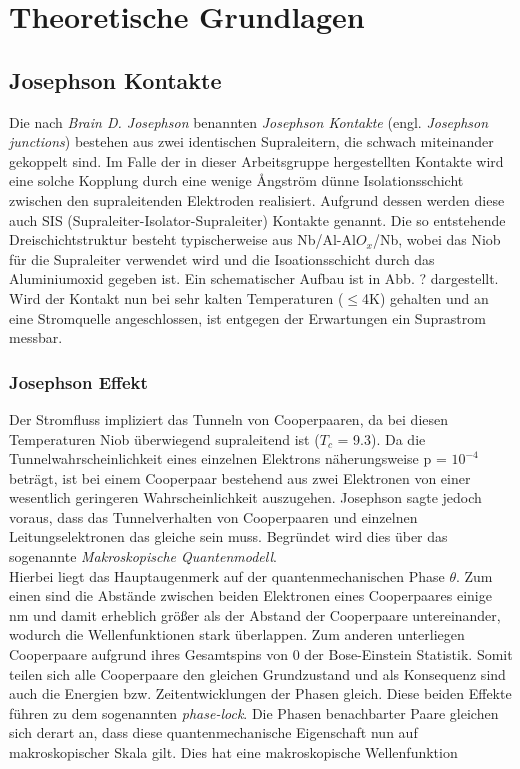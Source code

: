 \chapter{Theoretische Grundlagen}


\section{Josephson Kontakte}
Die nach \textit{Brain D. Josephson} benannten \textit{Josephson Kontakte} (engl. \textit{Josephson junctions}) bestehen aus zwei identischen Supraleitern, die schwach miteinander gekoppelt sind. Im Falle der in dieser Arbeitsgruppe hergestellten Kontakte wird eine solche Kopplung durch eine wenige \r{A}ngström dünne Isolationsschicht zwischen den supraleitenden Elektroden realisiert. Aufgrund dessen werden diese auch SIS (Supraleiter-Isolator-Supraleiter) Kontakte genannt. Die so entstehende Dreischichtstruktur besteht typischerweise aus Nb/Al-Al$O_x$/Nb, wobei das Niob für die Supraleiter verwendet wird und die Isoationsschicht durch das Aluminiumoxid gegeben ist. Ein schematischer Aufbau ist in Abb. ? dargestellt. 
Wird der Kontakt nun bei sehr kalten Temperaturen ($\leq$4K) gehalten und an eine Stromquelle angeschlossen, ist entgegen der Erwartungen ein Suprastrom messbar.
        
\subsection{Josephson Effekt}

Der Stromfluss impliziert das Tunneln von Cooperpaaren, da bei diesen Temperaturen Niob überwiegend supraleitend ist  (\texttt{${T_c}$} = 9.3). Da die Tunnelwahrscheinlichkeit eines einzelnen Elektrons näherungsweise p = $10^{-4}$ beträgt, ist bei einem Cooperpaar bestehend aus zwei Elektronen von einer wesentlich geringeren Wahrscheinlichkeit auszugehen. Josephson sagte jedoch voraus, dass das Tunnelverhalten von Cooperpaaren und einzelnen Leitungselektronen das gleiche sein muss. Begründet wird dies über das sogenannte \textit{Makroskopische Quantenmodell}. \\
Hierbei liegt das Hauptaugenmerk auf der quantenmechanischen Phase $\theta$. Zum einen sind die Abstände zwischen beiden Elektronen eines Cooperpaares einige nm und damit erheblich größer als der Abstand der Cooperpaare untereinander, wodurch die Wellenfunktionen stark überlappen. Zum anderen unterliegen Cooperpaare aufgrund ihres Gesamtspins von 0 der Bose-Einstein Statistik. Somit teilen sich alle Cooperpaare den gleichen Grundzustand und als Konsequenz sind auch die Energien bzw. Zeitentwicklungen der Phasen gleich. Diese beiden Effekte führen zu dem sogenannten \textit{phase-lock}. Die Phasen benachbarter Paare gleichen sich derart an, dass diese quantenmechanische Eigenschaft nun auf makroskopischer Skala gilt. Dies hat eine makroskopische Wellenfunktion 

